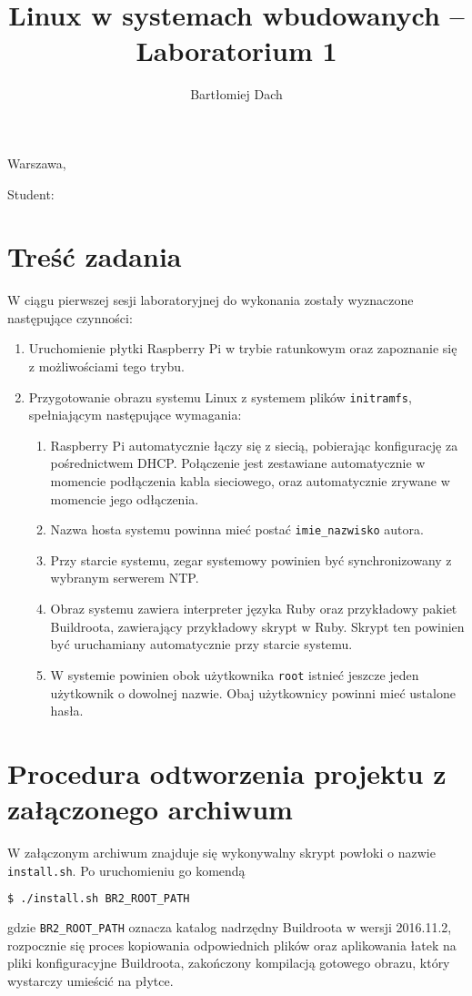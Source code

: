 \documentclass[10pt,a4paper]{article}
\title{Linux w systemach wbudowanych -- Laboratorium 1}
\author{Bartłomiej Dach}
\begin{document}
\makeatletter
\begin{flushright}
	Warszawa, \@date
\end{flushright}
\begin{center}
	\LARGE{\@title}
\end{center}
\vspace{0.25cm}
Student: \@author
\makeatother

\section{Treść zadania}

W ciągu pierwszej sesji laboratoryjnej do wykonania zostały wyznaczone następujące czynności:

\begin{enumerate}
	\item Uruchomienie płytki Raspberry Pi w trybie ratunkowym oraz zapoznanie się z możliwościami tego trybu.
	\item Przygotowanie obrazu systemu Linux z systemem plików \verb+initramfs+, spełniającym następujące wymagania:
	\begin{enumerate}
		\item Raspberry Pi automatycznie łączy się z siecią, pobierając konfigurację za pośrednictwem DHCP.
			Połączenie jest zestawiane automatycznie w momencie podłączenia kabla sieciowego, oraz automatycznie
			zrywane w momencie jego odłączenia.
		\item Nazwa hosta systemu powinna mieć postać \verb+imie_nazwisko+ autora.
		\item Przy starcie systemu, zegar systemowy powinien być synchronizowany z wybranym serwerem NTP.
		\item Obraz systemu zawiera interpreter języka Ruby oraz przykładowy pakiet Buildroota, zawierający przykładowy
			skrypt w Ruby. Skrypt ten powinien być uruchamiany automatycznie przy starcie systemu.
		\item W systemie powinien obok użytkownika \verb+root+ istnieć jeszcze jeden użytkownik o dowolnej nazwie.
			Obaj użytkownicy powinni mieć ustalone hasła.
	\end{enumerate}
\end{enumerate}

\section{Procedura odtworzenia projektu z załączonego archiwum}

W załączonym archiwum znajduje się wykonywalny skrypt powłoki o nazwie \verb+install.sh+. Po uruchomieniu go komendą
\begin{lstlisting}[language=bash]
$ ./install.sh BR2_ROOT_PATH
\end{lstlisting}
gdzie \verb+BR2_ROOT_PATH+ oznacza katalog nadrzędny Buildroota w wersji 2016.11.2, rozpocznie się proces kopiowania odpowiednich plików oraz aplikowania łatek na pliki konfiguracyjne Buildroota, zakończony kompilacją gotowego obrazu, który wystarczy umieścić na płytce.
\end{document}
